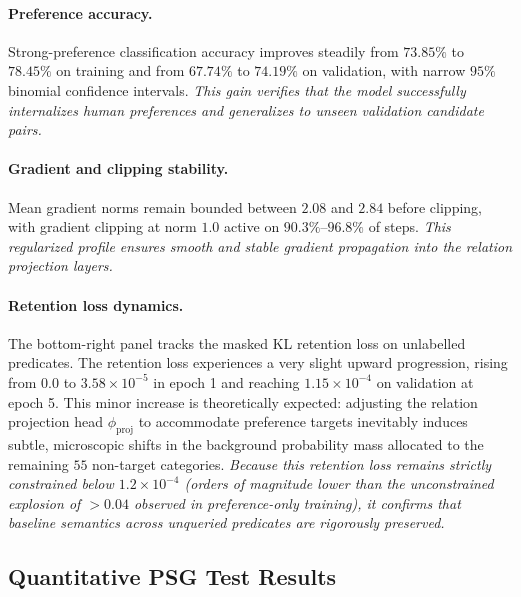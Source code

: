 \documentclass[10pt,twocolumn,letterpaper]{article}
\begin{document}
\paragraph{Preference accuracy.}
Strong-preference classification accuracy improves steadily from $73.85\%$ to $78.45\%$ on training and from $67.74\%$ to $74.19\%$ on validation, with narrow $95\%$ binomial confidence intervals. \textit{This gain verifies that the model successfully internalizes human preferences and generalizes to unseen validation candidate pairs.}

\paragraph{Gradient and clipping stability.}
Mean gradient norms remain bounded between $2.08$ and $2.84$ before clipping, with gradient clipping at norm $1.0$ active on $90.3\%\text{--}96.8\%$ of steps. \textit{This regularized profile ensures smooth and stable gradient propagation into the relation projection layers.}

\paragraph{Retention loss dynamics.}
The bottom-right panel tracks the masked KL retention loss on unlabelled predicates. The retention loss experiences a very slight upward progression, rising from $0.0$ to $3.58\times 10^{-5}$ in epoch 1 and reaching $1.15\times 10^{-4}$ on validation at epoch 5. This minor increase is theoretically expected: adjusting the relation projection head $\phi_{\mathrm{proj}}$ to accommodate preference targets inevitably induces subtle, microscopic shifts in the background probability mass allocated to the remaining $55$ non-target categories. \textit{Because this retention loss remains strictly constrained below $1.2\times 10^{-4}$ (orders of magnitude lower than the unconstrained explosion of $>0.04$ observed in preference-only training), it confirms that baseline semantics across unqueried predicates are rigorously preserved.}

\subsection{Quantitative PSG Test Results}
\label{sec:quant_results}
\end{document}
